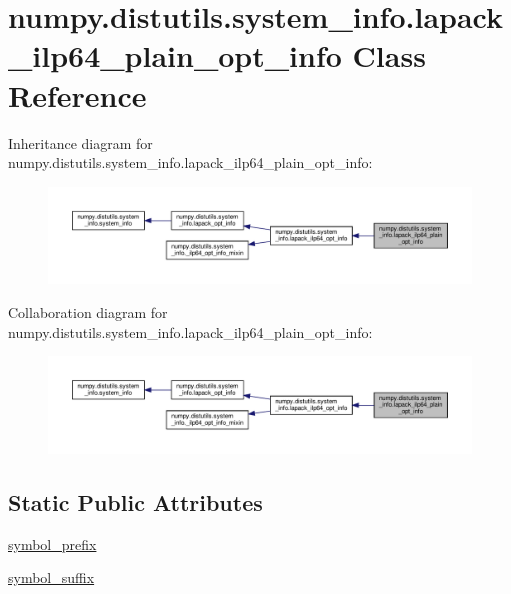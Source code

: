 \hypertarget{classnumpy_1_1distutils_1_1system__info_1_1lapack__ilp64__plain__opt__info}{}\section{numpy.\+distutils.\+system\+\_\+info.\+lapack\+\_\+ilp64\+\_\+plain\+\_\+opt\+\_\+info Class Reference}
\label{classnumpy_1_1distutils_1_1system__info_1_1lapack__ilp64__plain__opt__info}


Inheritance diagram for numpy.\+distutils.\+system\+\_\+info.\+lapack\+\_\+ilp64\+\_\+plain\+\_\+opt\+\_\+info\+:
\nopagebreak
\begin{figure}[H]
\begin{center}
\leavevmode
\includegraphics[width=350pt]{classnumpy_1_1distutils_1_1system__info_1_1lapack__ilp64__plain__opt__info__inherit__graph}
\end{center}
\end{figure}


Collaboration diagram for numpy.\+distutils.\+system\+\_\+info.\+lapack\+\_\+ilp64\+\_\+plain\+\_\+opt\+\_\+info\+:
\nopagebreak
\begin{figure}[H]
\begin{center}
\leavevmode
\includegraphics[width=350pt]{classnumpy_1_1distutils_1_1system__info_1_1lapack__ilp64__plain__opt__info__coll__graph}
\end{center}
\end{figure}
\subsection*{Static Public Attributes}
\begin{DoxyCompactItemize}
\item 
\hyperlink{classnumpy_1_1distutils_1_1system__info_1_1lapack__ilp64__plain__opt__info_a287fe228090a06d362f8a1d4e1c9c2dc}{symbol\+\_\+prefix}
\item 
\hyperlink{classnumpy_1_1distutils_1_1system__info_1_1lapack__ilp64__plain__opt__info_afa26cc1ed061c30607f3a62aa5ce80a6}{symbol\+\_\+suffix}
\end{DoxyCompactItemize}
